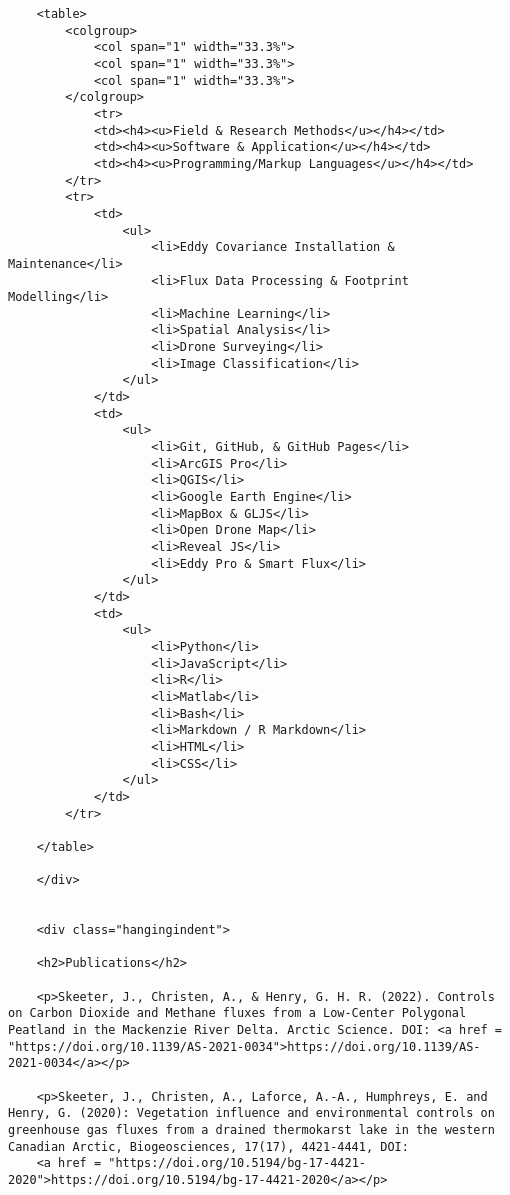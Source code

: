 \documentclass[
]{article}
\begin{document}
\begin{verbatim}
    <table>
        <colgroup>
            <col span="1" width="33.3%">
            <col span="1" width="33.3%">
            <col span="1" width="33.3%">
        </colgroup>
            <tr>
            <td><h4><u>Field & Research Methods</u></h4></td>
            <td><h4><u>Software & Application</u></h4></td>
            <td><h4><u>Programming/Markup Languages</u></h4></td>
        </tr>
        <tr>
            <td>
                <ul>
                    <li>Eddy Covariance Installation & Maintenance</li>
                    <li>Flux Data Processing & Footprint Modelling</li>
                    <li>Machine Learning</li>
                    <li>Spatial Analysis</li>
                    <li>Drone Surveying</li>
                    <li>Image Classification</li>
                </ul>
            </td>
            <td>
                <ul>
                    <li>Git, GitHub, & GitHub Pages</li>
                    <li>ArcGIS Pro</li>
                    <li>QGIS</li>
                    <li>Google Earth Engine</li>
                    <li>MapBox & GLJS</li>
                    <li>Open Drone Map</li>
                    <li>Reveal JS</li>
                    <li>Eddy Pro & Smart Flux</li>
                </ul>
            </td>
            <td>
                <ul>
                    <li>Python</li>
                    <li>JavaScript</li>
                    <li>R</li>
                    <li>Matlab</li>
                    <li>Bash</li>
                    <li>Markdown / R Markdown</li>
                    <li>HTML</li>
                    <li>CSS</li>
                </ul>
            </td>   
        </tr>
    
    </table>
    
    </div>
    
    
    <div class="hangingindent">
    
    <h2>Publications</h2>
    
    <p>Skeeter, J., Christen, A., & Henry, G. H. R. (2022). Controls on Carbon Dioxide and Methane fluxes from a Low-Center Polygonal Peatland in the Mackenzie River Delta. Arctic Science. DOI: <a href = "https://doi.org/10.1139/AS-2021-0034">https://doi.org/10.1139/AS-2021-0034</a></p>
    
    <p>Skeeter, J., Christen, A., Laforce, A.-A., Humphreys, E. and Henry, G. (2020): Vegetation influence and environmental controls on greenhouse gas fluxes from a drained thermokarst lake in the western Canadian Arctic, Biogeosciences, 17(17), 4421-4441, DOI: 
    <a href = "https://doi.org/10.5194/bg-17-4421-2020">https://doi.org/10.5194/bg-17-4421-2020</a></p>
    

\end{verbatim}
\end{document}
